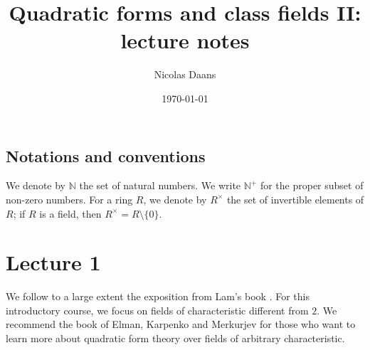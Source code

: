 \documentclass[12pt, leqno, british]{amsart}
\title{Quadratic forms and class fields II: lecture notes}
\author{Nicolas Daans}
\date{\today}
\theoremstyle{definition}
\theoremstyle{plain}
\theoremstyle{remark}
\newcommand{\mbb}{\mathbb}
\newcommand{\nat}{\mbb N}
\begin{document}
\maketitle
\tableofcontents

\subsection*{Notations and conventions}
We denote by $\nat$ the set of natural numbers.
We write $\nat^+$ for the proper subset of non-zero numbers.
For a ring $R$, we denote by $R^\times$ the set of invertible elements of $R$; if $R$ is a field, then $R^\times = R \setminus \lbrace 0 \rbrace$.

\section{Lecture 1}
We follow to a large extent the exposition from Lam's book \autocite{Lam}.
For this introductory course, we focus on fields of characteristic different from $2$.
We recommend the book of Elman, Karpenko and Merkurjev \autocite{ElmanKarpenkoMerkurjev} for those who want to learn more about quadratic form theory over fields of arbitrary characteristic.
\end{document}
